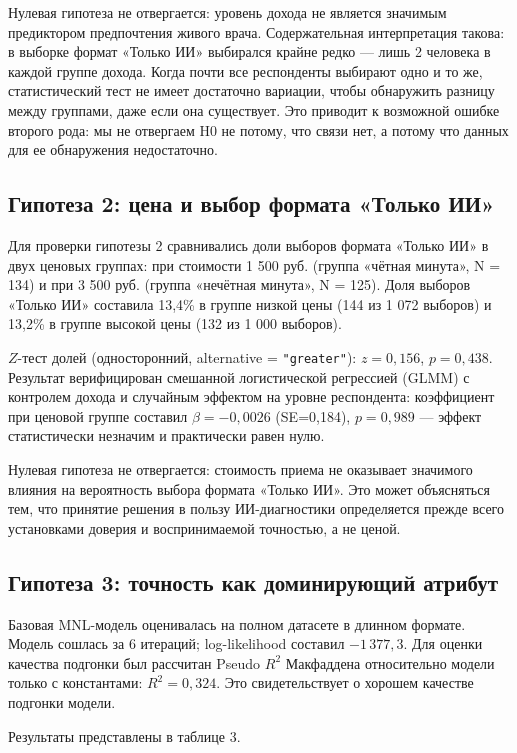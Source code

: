 \documentclass[12pt, a4paper]{article}
\begin{document}
Нулевая гипотеза не отвергается: уровень дохода не является значимым предиктором предпочтения живого врача. Содержательная интерпретация такова: в выборке формат «Только ИИ» выбирался крайне редко --- лишь 2 человека в каждой группе дохода. Когда почти все респонденты выбирают одно и то же, статистический тест не имеет достаточно вариации, чтобы обнаружить разницу между группами, даже если она существует. Это приводит к возможной ошибке второго рода: мы не отвергаем H0 не потому, что связи нет, а потому что данных для ее обнаружения недостаточно.

\subsection{Гипотеза 2: цена и выбор формата «Только ИИ»}
Для проверки гипотезы 2 сравнивались доли выборов формата «Только ИИ» в двух ценовых группах: при стоимости 1 500 руб. (группа «чётная минута», N = 134) и при 3 500 руб. (группа «нечётная минута», N = 125). Доля выборов «Только ИИ» составила 13,4\% в группе низкой цены (144 из 1 072 выборов) и 13,2\% в группе высокой цены (132 из 1 000 выборов).

$Z$-тест долей (односторонний, alternative = \texttt{"greater"}): $z = 0,156$, $p = 0,438$. Результат верифицирован смешанной логистической регрессией (GLMM) с контролем дохода и случайным эффектом на уровне респондента: коэффициент при ценовой группе составил $\beta = -0,0026$ (SE=0,184), $p = 0,989$ --- эффект статистически незначим и практически равен нулю.

Нулевая гипотеза не отвергается: стоимость приема не оказывает значимого влияния на вероятность выбора формата «Только ИИ». Это может объясняться тем, что принятие решения в пользу ИИ-диагностики определяется прежде всего установками доверия и воспринимаемой точностью, а не ценой.

\subsection{Гипотеза 3: точность как доминирующий атрибут}
Базовая MNL-модель оценивалась на полном датасете в длинном формате. Модель сошлась за 6 итераций; log-likelihood составил $-1\,377,3$. Для оценки качества подгонки был рассчитан Pseudo $R^2$ Макфаддена относительно модели только с константами: $R^2 = 0,324$. Это свидетельствует о хорошем качестве подгонки модели.

Результаты представлены в таблице 3.
\end{document}
